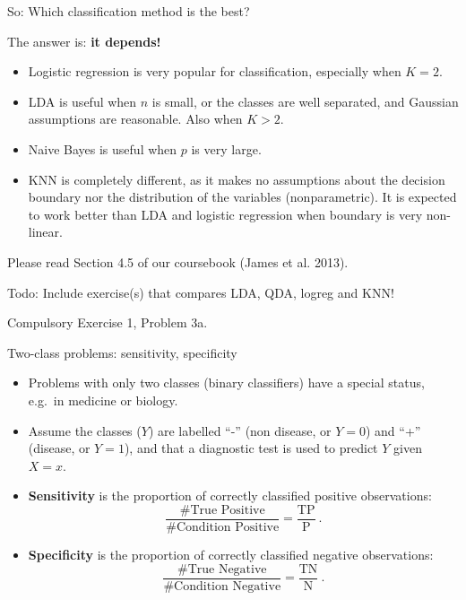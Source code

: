 \documentclass[10pt,ignorenonframetext,]{beamer}
\begin{document}
\begin{frame}{So: Which classification method is the best?}

\vspace{2mm}

The answer is: \textbf{it depends!}

\begin{itemize}
\item
  Logistic regression is very popular for classification, especially
  when \(K = 2\).
\item
  LDA is useful when \(n\) is small, or the classes are well separated,
  and Gaussian assumptions are reasonable. Also when \(K > 2\).
\item
  Naive Bayes is useful when \(p\) is very large.
\item
  KNN is completely different, as it makes no assumptions about the
  decision boundary nor the distribution of the variables
  (nonparametric). It is expected to work better than LDA and logistic
  regression when boundary is very non-linear.
\end{itemize}

\vspace{2mm} Please read Section 4.5 of our coursebook (James et al.
2013).

\end{frame}

\begin{frame}

\vspace{2mm} Todo: Include exercise(s) that compares LDA, QDA, logreg
and KNN!

Compulsory Exercise 1, Problem 3a.

\end{frame}

\begin{frame}{Two-class problems: sensitivity, specificity}

\begin{itemize}
\item
  Problems with only two classes (binary classifiers) have a special
  status, e.g.~in medicine or biology.
\item
  Assume the classes (\(Y\)) are labelled ``-'' (non disease, or
  \(Y=0\)) and ``+'' (disease, or \(Y=1\)), and that a diagnostic test
  is used to predict \(Y\) given \(X=x\).
\item
  \textbf{Sensitivity} is the proportion of correctly classified
  positive observations:
  \[\frac{\# \text{True Positive}}{\# \text{Condition Positive}}=\frac{\text{TP}}{\text{P}} \ .\]
\item
  \textbf{Specificity} is the proportion of correctly classified
  negative observations:
  \[\frac{\# \text{True Negative}}{\# \text{Condition Negative}}=\frac{\text{TN}}{\text{N}} \ .\]
\end{itemize}

\end{frame}
\end{document}
